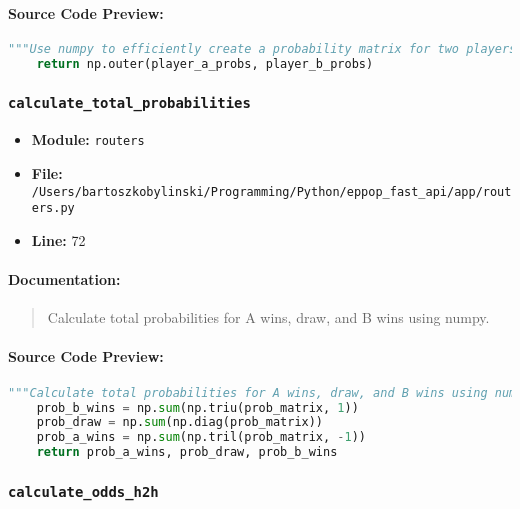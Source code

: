 \documentclass[11pt,a4paper]{article}
\begin{document}
\paragraph{Source Code Preview:}
\begin{lstlisting}[language=Python]
    """Use numpy to efficiently create a probability matrix for two players."""
    return np.outer(player_a_probs, player_b_probs)
\end{lstlisting}

\vspace{1em}
\subsubsection{\texttt{calculate\_total\_probabilities}}

\begin{itemize}
    \item \textbf{Module:} \texttt{routers}
    \item \textbf{File:} \texttt{/Users/bartoszkobylinski/Programming/Python/eppop\_fast\_api/app/routers.py}
    \item \textbf{Line:} 72
\end{itemize}

\paragraph{Documentation:}
\begin{quote}
Calculate total probabilities for A wins, draw, and B wins using numpy.
\end{quote}

\paragraph{Source Code Preview:}
\begin{lstlisting}[language=Python]
    """Calculate total probabilities for A wins, draw, and B wins using numpy."""
    prob_b_wins = np.sum(np.triu(prob_matrix, 1))
    prob_draw = np.sum(np.diag(prob_matrix))
    prob_a_wins = np.sum(np.tril(prob_matrix, -1))
    return prob_a_wins, prob_draw, prob_b_wins
\end{lstlisting}

\vspace{1em}
\subsubsection{\texttt{calculate\_odds\_h2h}}
\end{document}
